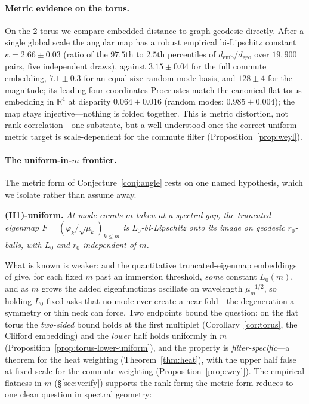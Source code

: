 \documentclass[review]{siamart220329}
\begin{document}
\paragraph{Metric evidence on the torus.} On the 2-torus we compare embedded
distance to graph geodesic directly. After a single global scale the angular
map has a robust empirical bi-Lipschitz constant $\kappa=2.66\pm0.03$ (ratio of
the $97.5$th to $2.5$th percentiles of $d_{\mathrm{emb}}/d_{\mathrm{geo}}$ over
$19{,}900$ pairs, five independent draws), against $3.15\pm0.04$ for the full
commute embedding, $7.1\pm0.3$ for an equal-size random-mode basis, and
$128\pm4$ for the magnitude; its leading four coordinates Procrustes-match the
canonical flat-torus embedding in $\mathbb{R}^{4}$ at disparity $0.064\pm0.016$
(random modes: $0.985\pm0.004$); the map stays injective---nothing is folded
together. This is metric distortion, not rank correlation---one substrate, but a
well-understood one: the correct uniform metric target is scale-dependent for the
commute filter (Proposition~\ref{prop:weyl}).

\paragraph{The uniform-in-$m$ frontier.} The metric form of
Conjecture~\ref{conj:angle} rests on one named hypothesis, which we isolate
rather than assume away.

\smallskip\noindent\textbf{(H1)-uniform.} \emph{At mode-counts $m$ taken at a
spectral gap, the truncated eigenmap $F=(\varphi_k/\sqrt{\mu_k})_{k\le m}$ is
$L_0$-bi-Lipschitz onto its image on geodesic $r_0$-balls, with $L_0$ and $r_0$
independent of $m$.}

\noindent What is known is weaker: \cite{berard1994} and the quantitative
truncated-eigenmap embeddings of \cite{bates2014,portegies2016} give, for each
fixed $m$ past an immersion threshold, \emph{some} constant $L_0(m)$, and as $m$
grows the added eigenfunctions oscillate on wavelength $\mu_m^{-1/2}$, so holding
$L_0$ fixed asks that no mode ever create a near-fold---the degeneration a
symmetry or thin neck can force. Two endpoints bound the question: on the flat
torus the \emph{two-sided} bound holds at the first multiplet
(Corollary~\ref{cor:torus}, the Clifford embedding) and the \emph{lower} half
holds uniformly in $m$ (Proposition~\ref{prop:torus-lower-uniform}), and the
property is \emph{filter-specific}---a theorem for the heat weighting
(Theorem~\ref{thm:heat}), with the upper half false at fixed scale for the commute
weighting (Proposition~\ref{prop:weyl}). The empirical flatness in $m$
(\S\ref{sec:verify}) supports the rank form; the metric form reduces to one clean
question in spectral geometry:
\end{document}
